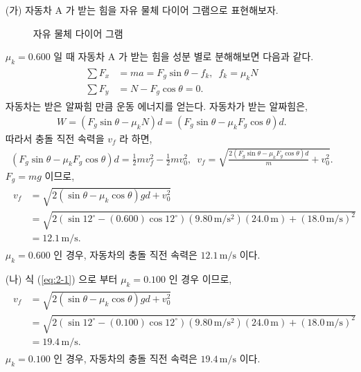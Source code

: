 \documentclass[fleqn,10pt]{article}%
\begin{document}
\begin{itemize}
  \item[(가)] 자동차 A 가 받는 힘을 자유 물체 다이어 그램으로 
표현해보자.
\begin{figure}[h]
  \centering
  \caption{자유 물체 다이어 그램}
\end{figure}
$\mu_k=0.600$ 일 때 자동차 A 가 받는 힘을 성분 별로 분해해보면 다음과 같다.
\begin{align}
  \begin{split}
    \sum F_x&=ma=F_g\sin{\theta}-f_k,\,\,\,f_k=\mu_k N \\
    \sum F_y&=N-F_g\cos{\theta}=0.
  \end{split}
\end{align}
자동차는 받은 알짜힘 만큼 운동 에너지를 얻는다. 자동차가 받는 알짜힘은,
\begin{align}
  W = (F_g\sin{\theta}-\mu_k N)d=(F_g\sin{\theta}-\mu_kF_g\cos{\theta})d.
\end{align}
따라서 충돌 직전 속력을 $v_f$ 라 하면,
\begin{align}
  (F_g\sin{\theta}-\mu_kF_g\cos{\theta})d 
  = \frac{1}{2}mv^2_f-\frac{1}{2}mv^2_0,\,\,\,
  v_f =\sqrt{\frac{2(F_g\sin{\theta}-\mu_kF_g\cos{\theta})d}{m} 
  +v^2_0}.
\end{align}
$F_g=mg$ 이므로,
\begin{align}\label{eq:2-1}
  \begin{split}
    v_f &= \sqrt{2(\sin{\theta}-\mu_k \cos{\theta})gd 
    +v^2_0} \\
    &= \sqrt{2(\sin{12^\circ}-(0.600) \cos{12^\circ})
    (9.80\,\mathrm{m/s^2})(24.0\,\mathrm{m}) 
    +(18.0\,\mathrm{m/s})^2} \\
    &= 12.1\,\mathrm{m/s}.
  \end{split}
\end{align}
$\mu_k=0.600$ 인 경우, 자동차의 충돌 직전 속력은 $12.1\,\mathrm{m/s}$ 이다.
\item[(나)] 식 (\ref{eq:2-1}) 으로 부터 $\mu_k=0.100$ 인 경우 이므로,
\begin{align}
  \begin{split}
    v_f &= \sqrt{2(\sin{\theta}-\mu_k \cos{\theta})gd 
    +v^2_0} \\
    &= \sqrt{2(\sin{12^\circ}-(0.100) \cos{12^\circ})
    (9.80\,\mathrm{m/s^2})(24.0\,\mathrm{m}) 
    +(18.0\,\mathrm{m/s})^2} \\
    &= 19.4\,\mathrm{m/s}.
  \end{split}
\end{align}
$\mu_k=0.100$ 인 경우, 자동차의 충돌 직전 속력은 $19.4\,\mathrm{m/s}$ 이다.
\end{itemize}
\end{document}
